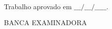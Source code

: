 \documentclass[monografia]{subfiles}
\begin{document}
\begin{folhadeaprovacao}
\begin{center}
	\ABNTEXsubsubsubsectionfont\MakeTextUppercase{\imprimirautor}
	\vspace*{\fill}
	\vspace*{\fill}
	\vspace*{\fill}

	\MakeTextUppercase{\imprimirtitulo}
	\vspace*{\fill}
	\vspace*{\fill}
	\vspace*{\fill}

	\OnehalfSpacing
	\imprimirnatureza{\imprimirtipotrabalho}\\
	\vspace*{\fill}

\end{center}

Trabalho aprovado em $\_\_\_/\_\_\_/\_\_\_\_\_$.\\

\begin{center}
	\MakeTextUppercase{Banca Examinadora}




	\vspace*{1cm}
\end{center}

\end{folhadeaprovacao}
\end{document}
